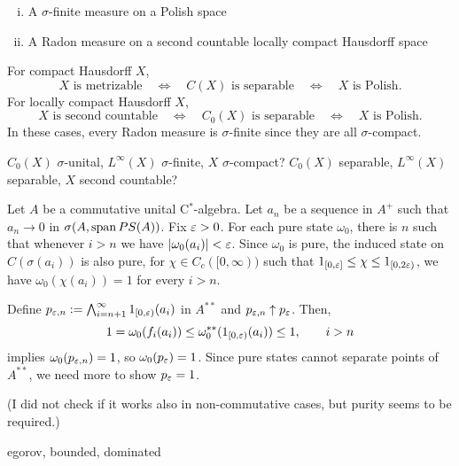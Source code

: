 \documentclass{../../large}
\begin{document}
\begin{prb}
\begin{enumerate}[(i)]
\item A $\sigma$-finite measure on a Polish space
\item A Radon measure on a second countable locally compact Hausdorff space
\end{enumerate}
For compact Hausdorff $X$,
\[\text{$X$ is metrizable}\quad\Leftrightarrow\quad
\text{$C(X)$ is separable}\quad\Leftrightarrow\quad
\text{$X$ is Polish}.\]
For locally compact Hausdorff $X$,
\[\text{$X$ is second countable}\quad\Leftrightarrow\quad
\text{$C_0(X)$ is separable}\quad\Leftrightarrow\quad
\text{$X$ is Polish}.\]
In these cases, every Radon measure is $\sigma$-finite since they are all $\sigma$-compact.

$C_0(X)$ $\sigma$-unital, $L^\infty(X)$ $\sigma$-finite, $X$ $\sigma$-compact?
$C_0(X)$ separable, $L^\infty(X)$ separable, $X$ second countable?

\end{prb}


\begin{prb}
Let $A$ be a commutative unital C$^*$-algebra.
Let $a_n$ be a sequence in $A^+$ such that $a_n\to0$ in $\sigma(A,\operatorname{span} PS(A))$.
Fix $\varepsilon>0$.
For each pure state $\omega_0$, there is $n$ such that whenever $i>n$ we have $|\omega_0(a_i)|<\varepsilon$.
Since $\omega_0$ is pure, the induced state on $C(\sigma(a_i))$ is also pure, for $\chi\in C_c([0,\infty))$ such that $1_{[0,\varepsilon]}\le\chi\le1_{[0,2\varepsilon)}$, we have $\omega_0(\chi(a_i))=1$ for every $i>n$.

Define $p_{\varepsilon,n}:=\bigwedge_{i=n+1}^\infty1_{[0,\varepsilon)}(a_i)$ in $A^{**}$ and $p_{\varepsilon,n}\uparrow p_\varepsilon$.
Then,
\[1=\omega_0(f_i(a_i))\le\omega_0^{**}(1_{[0,\varepsilon)}(a_i))\le1,\qquad i>n\]
implies $\omega_0(p_{\varepsilon,n})=1$, so $\omega_0(p_\varepsilon)=1$.
Since pure states cannot separate points of $A^{**}$, we need more to show $p_\varepsilon=1$.

(I did not check if it works also in non-commutative cases, but purity seems to be required.)

egorov, bounded, dominated
\end{prb}
\end{document}
